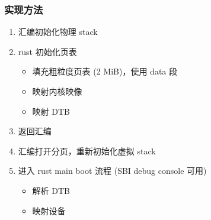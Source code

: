 \begin{frame}
    \frametitle{实现方法}

    \begin{enumerate}
        \item 汇编初始化物理 stack
        \item rust 初始化页表
              \begin{itemize}
                  \item 填充粗粒度页表 (2 MiB)，使用 data 段
                  \item 映射内核映像
                  \item 映射 DTB
              \end{itemize}
        \item 返回汇编
        \item 汇编打开分页，重新初始化虚拟 stack
        \item 进入 rust main boot 流程 (SBI debug console 可用)
              \begin{itemize}
                  \item 解析 DTB
                  \item 映射设备
              \end{itemize}

    \end{enumerate}


\end{frame}
